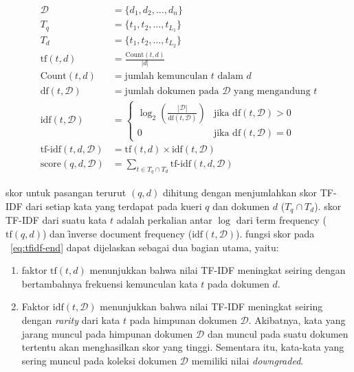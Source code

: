     \begin{align}
        \label{eq:tfidf-start}
        \mathcal{D} &= \{d_1, d_2, \dots, d_n\} \\
        T_q &= \{t_1, t_2, \dots, t_{L_1}\} \\
        T_d &= \{t_1, t_2, \dots, t_{L_2}\} \\
        \text{tf}(t, d) &= \frac{\text{Count}(t, d)}{|d|} \\
        \text{Count}(t, d) &= \text{jumlah kemunculan } t \text{ dalam } d \\
        \text{df}(t, \mathcal{D}) &= \text{jumlah dokumen pada } \mathcal{D} \text{ yang mengandung } t \\
        \text{idf}(t, \mathcal{D}) &= \begin{cases}
            \log_2\left(\frac{|\mathcal{D}|}{\text{df}(t, \mathcal{D})}\right) & \text{jika } \text{df}(t, \mathcal{D}) > 0 \\
            0 & \text{jika } \text{df}(t, \mathcal{D}) = 0
        \end{cases} \\
        \label{eq:tf-idf-weight}
        \text{tf-idf}(t, d, \mathcal{D}) &= \text{tf}(t, d) \times \text{idf}(t, \mathcal{D}) \\
        \label{eq:tfidf-end}
        \text{score}(q,d,\mathcal{D}) &= \sum_{t \in T_q \cap T_d} \text{tf-idf}(t, d, \mathcal{D})
    \end{align}

    skor untuk pasangan terurut $(q,d)$ dihitung dengan menjumlahkan skor TF-IDF dari setiap kata yang terdapat pada kueri $q$ dan dokumen $d$ ($T_q \cap T_d$). skor TF-IDF dari suatu kata $t$ adalah perkalian antar $\log$ dari \f{term frequency} ($\text{tf}(q,d)$) dan \f{inverse document frequency} ($\text{idf}(t,\mathcal{D})$). fungsi skor pada \equ~\ref{eq:tfidf-end} dapat dijelaskan sebagai dua bagian utama, yaitu:

    \begin{enumerate}
        \item faktor $\text{tf}(t, d)$ menunjukkan bahwa nilai TF-IDF meningkat seiring dengan bertambahnya frekuensi kemunculan kata $t$ pada dokumen $d$.
        \item Faktor $\text{idf}(t, \mathcal{D})$ menunjukkan bahwa nilai TF-IDF meningkat seiring dengan \textit{rarity} dari kata $t$ pada himpunan dokumen $\mathcal{D}$. Akibatnya, kata yang jarang muncul pada himpunan dokumen $\mathcal{D}$ dan muncul pada suatu dokumen tertentu akan menghasilkan skor yang tinggi. Sementara itu, kata-kata yang sering muncul pada koleksi dokumen $\mathcal{D}$ memiliki nilai \textit{downgraded}.
    \end{enumerate}

